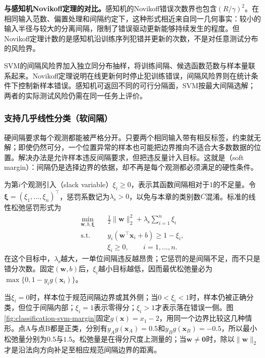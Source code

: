 \label{sec:classification-svm-perceptron-comparison}

\textbf{与感知机Novikoff定理的对比。}感知机的Novikoff错误次数界也包含$(R/\gamma)^2$。在相同输入范数、偏置处理和间隔约定下，这种形式相近来自同一几何事实：较小的输入半径与较大的分离间隔，限制了错误驱动更新能够持续发生的程度。但Novikoff定理计数的是感知机沿训练序列犯错并更新的次数，不是对任意测试分布的风险界。

SVM的间隔风险界加入独立同分布抽样，将训练间隔、候选函数范数与样本量联系起来。Novikoff定理说明在线更新何时停止犯训练错误，间隔风险界则在统计条件下控制新样本错误。感知机可返回不同的可行分隔面，SVM按最大间隔选解；两者的实际测试风险仍需在同一任务上评价。

\subsubsection{支持几乎线性分类（软间隔）}
\label{sec:classification-svm-soft-margin}

硬间隔要求每个观测都能被严格分开。只要两个相同输入带有相反标签，约束就无解；即使仍然可分，一个位置异常的样本也可能把边界推向不适合大多数数据的位置。解决办法是允许样本违反间隔要求，但把违反量计入目标。这就是（soft margin）：间隔仍是选择边界的依据，却不再是每个观测都必须满足的硬性条件。

为第$i$个观测引入（slack variable）$\xi_i\ge0$，表示其函数间隔相对于$1$的不足量。令$\bm{\xi}=(\xi_1,\ldots,\xi_n)^{\top}$，惩罚系数记为$\lambda_{\mathrm{s}}>0$，以免与本章的类别数$C$混淆。标准的线性松弛惩罚形式为
\begin{equation}
  \begin{aligned}
    \min_{\bm{w},b,\bm{\xi}}\quad&
      \frac12\lVert\bm{w}\rVert_2^2
       +\lambda_{\mathrm{s}}\sum_{i=1}^n\xi_i\\
    \text{s.t.}\quad&
      y_i(\bm{w}^{\top}\bm{x}_i+b)\ge1-\xi_i,\\
    &\xi_i\ge0,\qquad i=1,\ldots,n.
  \end{aligned}
  \label{eq:classification-svm-soft-primal}
\end{equation}
在这个目标中，$\lambda_{\mathrm{s}}$越大，一单位间隔违反越昂贵；它惩罚的是间隔不足，而不只是错分次数。固定$(\bm{w},b)$后，$\xi_i$越小目标越低，因而最优松弛量必为$\max\{0,1-y_i g(\bm{x}_i)\}$。

当$\xi_i=0$时，样本位于规范间隔边界或其外侧；当$0<\xi_i<1$时，样本仍被正确分类，但位于间隔内部；$\xi_i=1$表示零得分；$\xi_i>1$才表示落在错误一侧。图\ref{fig:classification-svm-margin}固定$g(\bm{x})=x_1-2$，用同一个边界比较这几种情形。点A与点B都是正类，分别有$y_Ag(\bm{x}_A)=0.5$和$y_Bg(\bm{x}_B)=-0.5$，所以最小松弛量分别为$0.5$与$1.5$。松弛量是在得分尺度上测量的；当$\bm{w}\ne\bm{0}$时，除以$\lVert\bm{w}\rVert_2$才是沿法向方向补足至相应规范间隔边界的距离。

